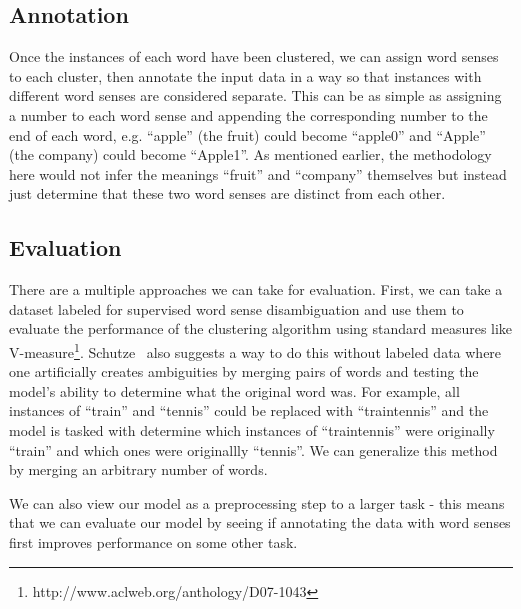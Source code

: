 \documentclass[11pt,letterpaper]{article}
\begin{document}
\subsection{Annotation}
Once the instances of each word have been clustered, we can assign word senses to each cluster, then annotate the input data in a way so that instances with different word senses are considered separate. This can be as simple as assigning a number to each word sense and appending the corresponding number to the end of each word, e.g. ``apple'' (the fruit) could become ``apple0'' and ``Apple'' (the company) could become ``Apple1''. As mentioned earlier, the methodology here would not infer the meanings ``fruit'' and ``company'' themselves but instead just determine that these two word senses are distinct from each other.

\subsection{Evaluation}
There are a multiple approaches we can take for evaluation. First, we can take a dataset labeled for supervised word sense disambiguation and use them to evaluate the performance of the clustering algorithm using standard measures like V-measure\footnote{http://www.aclweb.org/anthology/D07-1043}. Schutze~ also suggests a way to do this without labeled data where one artificially creates ambiguities by merging pairs of words and testing the model's ability to determine what the original word was. For example, all instances of ``train'' and ``tennis'' could be replaced with ``traintennis'' and the model is tasked with determine which instances of ``traintennis'' were originally ``train'' and which ones were originallly ``tennis''. We can generalize this method by merging an arbitrary number of words. 

We can also view our model as a preprocessing step to a larger task - this means that we can evaluate our model by seeing if annotating the data with word senses first improves performance on some other task.  



\end{document}
